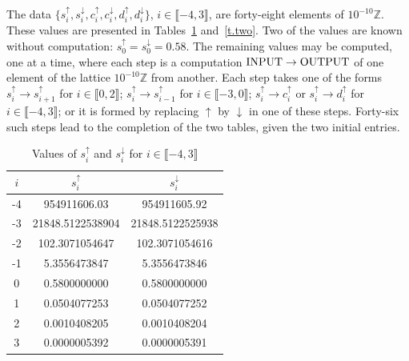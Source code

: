 \documentclass[letterpaper,11pt,oneside,reqno]{amsbook}
\newcommand{\Z}{\ensuremath{\mathbb{Z}}}
\numberwithin{figure}{chapter}
\theoremstyle{definition}
\theoremstyle{definition}
\theoremstyle{definition}
\theoremstyle{definition}
\theoremstyle{definition}
\begin{document}
  The data $\big\{ s^\uparrow_i,s^\downarrow_i,c^\uparrow_i,c^\downarrow_i,d^\uparrow_i,d^\downarrow_i \big\}$, $i \in \llbracket -4,3 \rrbracket$,
  are forty-eight elements of $10^{-10}\Z$. These values are presented in Tables~\ref{t.one} and~\ref{t.two}. Two of the values are known without computation: $s_0^\uparrow = s_0^\downarrow =0.58$.
  The remaining values may be computed, one at a time, where each  step is a computation ${\rm INPUT} \rightarrow {\rm OUTPUT}$
of one element of the lattice $10^{-10}\Z$ from another. Each step takes 
one of the forms $s_i^\uparrow \to s^\uparrow_{i+1}$ for $i \in \llbracket 0,2 \rrbracket$;  
$s_i^\uparrow \to s^\uparrow_{i-1}$ 
for $i \in \llbracket -3,0 \rrbracket$;   
$s_i^\uparrow \to  c_i^\uparrow$ or $s_i^\uparrow \to  d_i^\uparrow$ for $i \in \llbracket -4,3 \rrbracket$;
or it is formed by replacing $\uparrow$ by $\downarrow$ in one of these steps. Forty-six such steps lead to the completion of the two tables, given the two initial entries.
 \begin{table}
 \begin{center}
 \begin{tabular}{| c | c | c |}
 \hline
 $i$ & $s_i^\uparrow$ & $s_i^\downarrow$  \\
 \hline
  -4 & 954911606.03  & 954911605.92    \\ 
 -3 & 21848.5122538904 & 21848.5122525938  \\
 -2 & 102.3071054647 &102.3071054616\\
 -1 & 5.3556473847 & 5.3556473846  \\
0 & 0.5800000000  & 0.5800000000 \\
1 & 0.0504077253 & 0.0504077252  \\
2 & 0.0010408205 & 0.0010408204  \\
3 & 0.0000005392  & 0.0000005391  
 \\
 \hline
 \end{tabular}
 \caption{Values of  $s_i^\uparrow$ and $s_i^\downarrow$ for $i \in \llbracket -4,3 \rrbracket$}\label{t.one}
 \end{center}
 \end{table}
\end{document}
